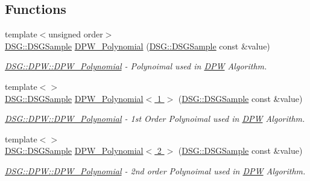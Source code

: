 \subsection*{Functions}
\begin{DoxyCompactItemize}
\item 
{\footnotesize template$<$unsigned order$>$ }\\\hyperlink{namespace_d_s_g_ac39a94cd27ebcd9c1e7502d0c624894a}{D\+S\+G\+::\+D\+S\+G\+Sample} \hyperlink{namespace_d_s_g_1_1_d_p_w_a1677c6fedac376f3e9b284bc9a4a227c}{D\+P\+W\+\_\+\+Polynomial} (\hyperlink{namespace_d_s_g_ac39a94cd27ebcd9c1e7502d0c624894a}{D\+S\+G\+::\+D\+S\+G\+Sample} const \&value)
\begin{DoxyCompactList}\small\item\em \hyperlink{namespace_d_s_g_1_1_d_p_w_a1677c6fedac376f3e9b284bc9a4a227c}{D\+S\+G\+::\+D\+P\+W\+::\+D\+P\+W\+\_\+\+Polynomial} -\/ Polynoimal used in \hyperlink{namespace_d_s_g_1_1_d_p_w}{D\+P\+W} Algorithm. \end{DoxyCompactList}\item 
{\footnotesize template$<$$>$ }\\\hyperlink{namespace_d_s_g_ac39a94cd27ebcd9c1e7502d0c624894a}{D\+S\+G\+::\+D\+S\+G\+Sample} \hyperlink{namespace_d_s_g_1_1_d_p_w_a8330d5b0b7bdf2247cdd357f9707eaaf}{D\+P\+W\+\_\+\+Polynomial$<$ 1 $>$} (\hyperlink{namespace_d_s_g_ac39a94cd27ebcd9c1e7502d0c624894a}{D\+S\+G\+::\+D\+S\+G\+Sample} const \&value)
\begin{DoxyCompactList}\small\item\em \hyperlink{namespace_d_s_g_1_1_d_p_w_a1677c6fedac376f3e9b284bc9a4a227c}{D\+S\+G\+::\+D\+P\+W\+::\+D\+P\+W\+\_\+\+Polynomial} -\/ 1st Order Polynoimal used in \hyperlink{namespace_d_s_g_1_1_d_p_w}{D\+P\+W} Algorithm. \end{DoxyCompactList}\item 
{\footnotesize template$<$$>$ }\\\hyperlink{namespace_d_s_g_ac39a94cd27ebcd9c1e7502d0c624894a}{D\+S\+G\+::\+D\+S\+G\+Sample} \hyperlink{namespace_d_s_g_1_1_d_p_w_a140753401d8518aa64bbcd7496a65b45}{D\+P\+W\+\_\+\+Polynomial$<$ 2 $>$} (\hyperlink{namespace_d_s_g_ac39a94cd27ebcd9c1e7502d0c624894a}{D\+S\+G\+::\+D\+S\+G\+Sample} const \&value)
\begin{DoxyCompactList}\small\item\em \hyperlink{namespace_d_s_g_1_1_d_p_w_a1677c6fedac376f3e9b284bc9a4a227c}{D\+S\+G\+::\+D\+P\+W\+::\+D\+P\+W\+\_\+\+Polynomial} -\/ 2nd order Polynoimal used in \hyperlink{namespace_d_s_g_1_1_d_p_w}{D\+P\+W} Algorithm. \end{DoxyCompactList}\item 

\end{DoxyCompactItemize}
